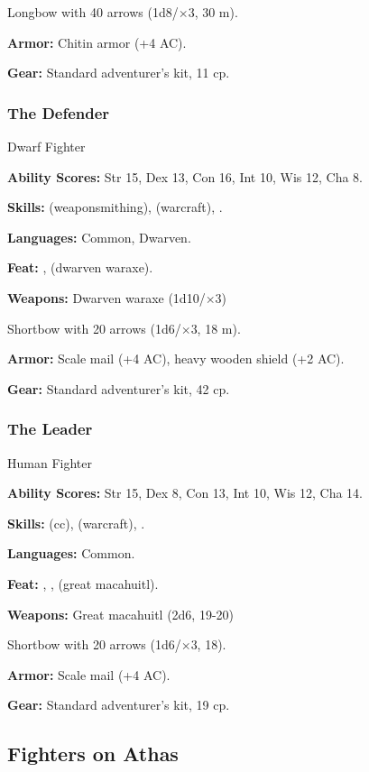 Longbow with 40 arrows (1d8/$\times$3, 30 m).

\textbf{Armor:} Chitin armor (+4 AC).

\textbf{Gear:} Standard adventurer's kit, 11 cp.

\subsubsection{The Defender}
Dwarf Fighter

\textbf{Ability Scores:} Str 15, Dex 13, Con 16, Int 10, Wis 12, Cha 8.

\textbf{Skills:}  (weaponsmithing),  (warcraft), .

\textbf{Languages:} Common, Dwarven.

\textbf{Feat:} ,  (dwarven waraxe).

\textbf{Weapons:} Dwarven waraxe (1d10/$\times$3)

Shortbow with 20 arrows (1d6/$\times$3, 18 m).

\textbf{Armor:} Scale mail (+4 AC), heavy wooden shield (+2 AC).

\textbf{Gear:} Standard adventurer's kit, 42 cp.

\subsubsection{The Leader}
Human Fighter

\textbf{Ability Scores:} Str 15, Dex 8, Con 13, Int 10, Wis 12, Cha 14.

\textbf{Skills:}  (cc),  (warcraft), .

\textbf{Languages:} Common.

\textbf{Feat:} , ,  (great macahuitl).

\textbf{Weapons:} Great macahuitl (2d6, 19-20)

Shortbow with 20 arrows (1d6/$\times$3, 18).

\textbf{Armor:} Scale mail (+4 AC).

\textbf{Gear:} Standard adventurer's kit, 19 cp.


\subsection{Fighters on Athas}

